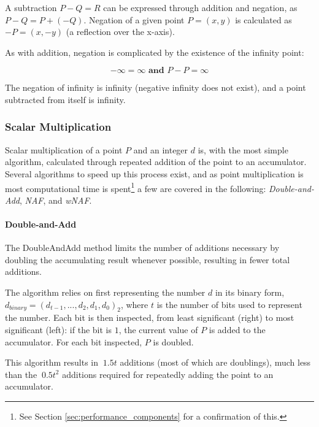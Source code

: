 A subtraction \(P - Q = R\) can be expressed through addition and negation, as \(P - Q = P + (-Q)\). Negation of a given point
\(P = (x,y)\) is calculated as \(-P = (x,-y)\) (a reflection over the x-axis).

As with addition, negation is complicated by the existence of the infinity point:

\begin{equation}
	-\infty = \infty \textbf{ and } P - P = \infty
\end{equation}

The negation of infinity is infinity (negative infinity does not exist), and a point subtracted from itself is infinity.\cite{hankerson2010}

\subsubsection{Scalar Multiplication}
\label{sec:math_curve_multiplication}

Scalar multiplication of a point \(P\) and an integer \(d\) is, with the most simple algorithm, calculated through repeated addition
of the point to an accumulator. Several algorithms to speed up this process exist, and as point multiplication is most computational
time is spent\footnote{See Section \ref{sec:performance_components} for a confirmation of this.} a few are covered in the following:
\emph{Double-and-Add}, \emph{NAF}, and \emph{wNAF}.

\paragraph{Double-and-Add}

The DoubleAndAdd method limits the number of additions necessary by doubling the accumulating result whenever possible, resulting in
fewer total additions.

The algorithm relies on first representing the number \(d\) in its binary form, \(d_{binary} = (d_{t-1}, ... , d_2, d_1, d_0)_2\),
where \(t\) is the number of bits used to represent the number. Each bit is then inspected, from least significant (right) to most
significant (left): if the bit is \(1\), the current value of \(P\) is added to the accumulator. For each bit inspected, \(P\) is
doubled.\cite{hankerson2010}

This algorithm results in \(~1.5t\) additions (most of which are doublings), much less than the \(~0.5t^2\) additions required for
repeatedly adding the point to an accumulator.

